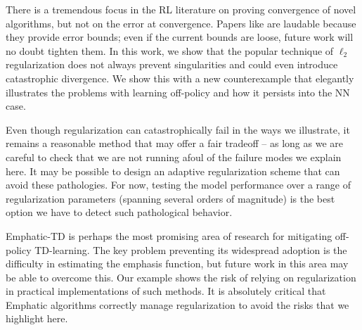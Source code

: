 There is a tremendous focus in the RL literature on proving convergence of novel algorithms, but not on the error at convergence. Papers like \cite{zhang2021breaking} are laudable because they provide error bounds; even if the current bounds are loose, future work will no doubt tighten them.
In this work, we show that the popular technique of $\ell_2$ regularization does not always prevent singularities and could even introduce catastrophic divergence. We show this with a new counterexample that elegantly illustrates the problems with learning off-policy and how it persists into the NN case.

Even though regularization can catastrophically fail in the ways we illustrate, it remains a reasonable method that may offer a fair tradeoff -- as long as we are careful to check that we are not running afoul of the failure modes we explain here. It may be possible to design an adaptive regularization scheme that can avoid these pathologies. For now, testing the model performance over a range of regularization parameters (spanning several orders of magnitude) is the best option we have to detect such pathological behavior.

Emphatic-TD is perhaps the most promising area of research for mitigating off-policy TD-learning. The key problem preventing its widespread adoption is the difficulty in estimating the emphasis function, but future work in this area may be able to overcome this. Our example shows the risk of relying on regularization in practical implementations of such methods. It is absolutely critical that Emphatic algorithms correctly manage regularization to avoid the risks that we highlight here.


